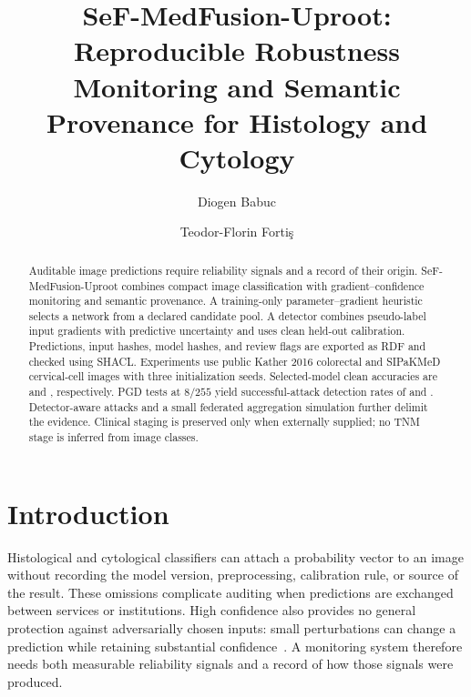 \documentclass{svproc}
\providecommand{\orcidID}[1]{}
\begin{document}
\ifdefined\AINATemplate\mainmatter\fi
\title{SeF-MedFusion-Uproot: Reproducible Robustness Monitoring and Semantic Provenance for Histology and Cytology}
\author{Diogen Babuc\orcidID{0009-0000-5126-6480} \and Teodor-Florin Forti\c{s}\orcidID{0000-0002-3143-8908}}
\maketitle

\begin{abstract}
Auditable image predictions require reliability signals and a record of their origin. SeF-MedFusion-Uproot combines compact image classification with gradient--confidence monitoring and semantic provenance. A training-only parameter--gradient heuristic selects a network from a declared candidate pool. A detector combines pseudo-label input gradients with predictive uncertainty and uses clean held-out calibration. Predictions, input hashes, model hashes, and review flags are exported as RDF and checked using SHACL. Experiments use public Kather 2016 colorectal and SIPaKMeD cervical-cell images with three initialization seeds. Selected-model clean accuracies are \KAcc{} and \SAcc{}, respectively. PGD tests at $8/255$ yield successful-attack detection rates of \KPGDTPR{} and \SPGDTPR{}. Detector-aware attacks and a small federated aggregation simulation further delimit the evidence. Clinical staging is preserved only when externally supplied; no TNM stage is inferred from image classes.
\ifdefined\AINATemplate
{}
\else
{}
\fi
\end{abstract}

\section{Introduction}
Histological and cytological classifiers can attach a probability vector to an image without recording the model version, preprocessing, calibration rule, or source of the result. These omissions complicate auditing when predictions are exchanged between services or institutions. High confidence also provides no general protection against adversarially chosen inputs: small perturbations can change a prediction while retaining substantial confidence~\cite{goodfellow2015,madry2018}. A monitoring system therefore needs both measurable reliability signals and a record of how those signals were produced.
\end{document}
